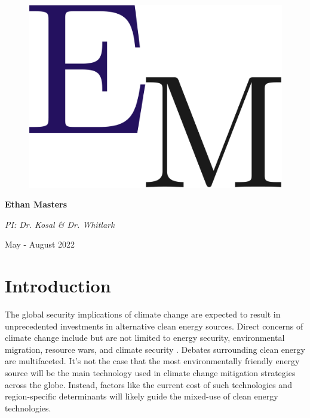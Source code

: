 \documentclass[11,5 pt]{article}
\begin{document}
\begin{titlepage}
\vspace{1.5cm}
\begin{figure}[ht!]
\centering
\includegraphics[scale=0.08]{images/Initials.png}
\end{figure}
{\bfseries\LARGE Ethan Masters \par}
\vspace{0.55cm}
{\LARGE \textit{PI: Dr. Kosal \& Dr. Whitlark}\par}
\vspace{1.2cm}

{\Large May - August 2022 \par}
\end{titlepage}

\renewcommand{\headrulewidth}{0.5pt}

\tableofcontents

\newpage

\section{Introduction}
The global security implications of climate change are expected to result in unprecedented investments in alternative clean energy sources. Direct concerns of climate change include but are not limited to energy security, environmental migration, resource wars, and climate security \cite{scheffran2011climate}. Debates surrounding clean energy are multifaceted. It’s not the case that the most environmentally friendly energy source will be the main technology used in climate change mitigation strategies across the globe. Instead, factors like the current cost of such technologies and region-specific determinants will likely guide the mixed-use of clean energy technologies.
\end{document}
